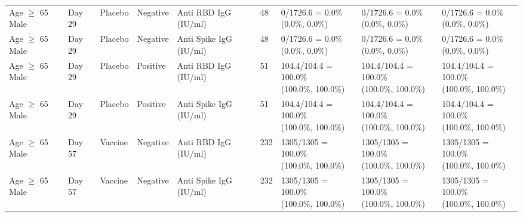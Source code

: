 \documentclass[]{book}
\theoremstyle{definition}
\theoremstyle{definition}
\theoremstyle{definition}
\newcommand{\1}{\mathbbm{1}}
\begin{document}
\begin{landscape}
\begin{ThreePartTable}
\begin{longtable}[t]{>{\raggedright\arraybackslash}p{2.7cm}llllllll}
\hspace{1em}Age $\geq$ 65 Male & Day 29 & Placebo & Negative & Anti RBD IgG (IU/ml) & 48 & \makecell[l]{0/1726.6 = 0.0\%\\(0.0\%, 0.0\%)} & \makecell[l]{0/1726.6 = 0.0\%\\(0.0\%, 0.0\%)} & \makecell[l]{0/1726.6 = 0.0\%\\(0.0\%, 0.0\%)}\\
\hspace{1em}Age $\geq$ 65 Male & Day 29 & Placebo & Negative & Anti Spike IgG (IU/ml) & 48 & \makecell[l]{0/1726.6 = 0.0\%\\(0.0\%, 0.0\%)} & \makecell[l]{0/1726.6 = 0.0\%\\(0.0\%, 0.0\%)} & \makecell[l]{0/1726.6 = 0.0\%\\(0.0\%, 0.0\%)}\\
\hspace{1em}Age $\geq$ 65 Male & Day 29 & Placebo & Positive & Anti RBD IgG (IU/ml) & 51 & \makecell[l]{104.4/104.4 = 100.0\%\\(100.0\%, 100.0\%)} & \makecell[l]{104.4/104.4 = 100.0\%\\(100.0\%, 100.0\%)} & \makecell[l]{104.4/104.4 = 100.0\%\\(100.0\%, 100.0\%)}\\
\hspace{1em}Age $\geq$ 65 Male & Day 29 & Placebo & Positive & Anti Spike IgG (IU/ml) & 51 & \makecell[l]{104.4/104.4 = 100.0\%\\(100.0\%, 100.0\%)} & \makecell[l]{104.4/104.4 = 100.0\%\\(100.0\%, 100.0\%)} & \makecell[l]{104.4/104.4 = 100.0\%\\(100.0\%, 100.0\%)}\\
\hspace{1em}Age $\geq$ 65 Male & Day 57 & Vaccine & Negative & Anti RBD IgG (IU/ml) & 232 & \makecell[l]{1305/1305 = 100.0\%\\(100.0\%, 100.0\%)} & \makecell[l]{1305/1305 = 100.0\%\\(100.0\%, 100.0\%)} & \makecell[l]{1305/1305 = 100.0\%\\(100.0\%, 100.0\%)}\\
\hspace{1em}Age $\geq$ 65 Male & Day 57 & Vaccine & Negative & Anti Spike IgG (IU/ml) & 232 & \makecell[l]{1305/1305 = 100.0\%\\(100.0\%, 100.0\%)} & \makecell[l]{1305/1305 = 100.0\%\\(100.0\%, 100.0\%)} & \makecell[l]{1305/1305 = 100.0\%\\(100.0\%, 100.0\%)}\\

\end{longtable}
\end{ThreePartTable}
\end{landscape}
\end{document}
